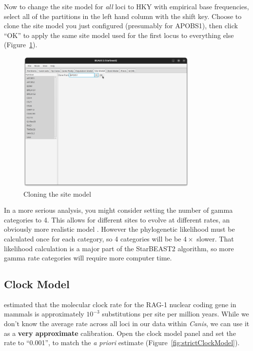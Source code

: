 \documentclass[12pt]{article}
\begin{document}
Now to change the site model for \textit{all} loci to HKY with empirical base frequencies,
select all of the partitions in the left hand column with the shift key. Choose to clone the site model you just configured (presumably for APOBS1), then
click ``OK'' to apply the same site model used for the first locus
to everything else (Figure~\ref{fig:cloneSiteModel}).

\begin{figure}[htb!]
\centering
\includegraphics[width=0.8\textwidth]{figures/cloneSiteModel.png}
\caption
{Cloning the site model}
\label{fig:cloneSiteModel}
\end{figure}

In a more serious analysis, you might consider setting the number of gamma
categories to 4. This allows for different sites to evolve at
different rates, an obviously more realistic model \parencite{Yang1994}. However
the phylogenetic likelihood must be calculated once for each category, so 4
categories will be be $4\times$ slower. That likelihood calculation is a major
part of the StarBEAST2 algorithm, so more gamma rate categories will require
more computer time.

\subsection{Clock Model}
\label{subsec:clockModel}

\cite{Hugall2007} estimated that the molecular
clock rate for the RAG-1 nuclear coding gene in mammals is approximately
$10^{-3}$ substitutions per site per million years. While we don't know
the average rate across all loci in our data within \textit{Canis}, we can
use it as a \textbf{very approximate} calibration. Open the clock model panel
and set the rate to ``0.001'', to match the \textit{a priori} estimate
(Figure~\ref{fig:strictClockModel}).
\end{document}

